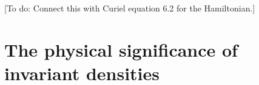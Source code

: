 \documentclass[letterpaper]{article}
\begin{document}
[To do: Connect this with Curiel equation 6.2 for the Hamiltonian.]





\section{The physical significance of invariant densities}
\label{density}

\end{document}
